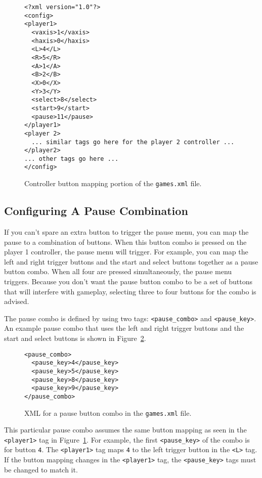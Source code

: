 \begin{figure}[h]
\begin{verbatim}<?xml version="1.0"?>
<config>
<player1>
  <vaxis>1</vaxis>
  <haxis>0</haxis>
  <L>4</L>
  <R>5</R>
  <A>1</A>
  <B>2</B>
  <X>0</X>
  <Y>3</Y>
  <select>8</select>
  <start>9</start>
  <pause>11</pause>
</player1>
<player 2>
  ... similar tags go here for the player 2 controller ...
</player2>
... other tags go here ...
</config>\end{verbatim}
\caption{Controller button mapping portion of the \texttt{games.xml} file.}\label{fig:controller_map}
\end{figure}

\subsection{Configuring A Pause Combination}\label{sec:conf_pause}

If you can't spare an extra button to trigger the pause menu, you can map the pause to a combination of buttons. When this button combo is pressed on the player 1 controller, the pause menu will trigger.  For example, you can map the left and right trigger buttons and the start and select buttons together as a pause button combo.  When all four are pressed simultaneously, the pause menu triggers.  Because you don't want the pause button combo to be a set of buttons that will interfere with gameplay, selecting three to four buttons for the combo is advised. 

The pause combo is defined by using two tags: \texttt{<pause\_combo>} and \texttt{<pause\_key>}.  An example pause combo that uses the left and right trigger buttons and the start and select buttons is shown in Figure~\ref{fig:pause_combo}.

\begin{figure}[h]
\begin{verbatim}<pause_combo>
  <pause_key>4</pause_key>
  <pause_key>5</pause_key>
  <pause_key>8</pause_key>
  <pause_key>9</pause_key>
</pause_combo>\end{verbatim}
\caption{XML for a pause button combo in the \texttt{games.xml} file.}\label{fig:pause_combo}
\end{figure}

This particular pause combo assumes the same button mapping as seen in the \texttt{<player1>} tag in Figure~\ref{fig:controller_map}.  For example, the first \texttt{<pause\_key>} of the combo is for button \texttt{4}.  The \texttt{<player1>} tag maps \texttt{4} to the left trigger button in the \texttt{<L>} tag. If the button mapping changes in the \texttt{<player1>} tag, the \texttt{<pause\_key>} tags must be changed to match it. 

